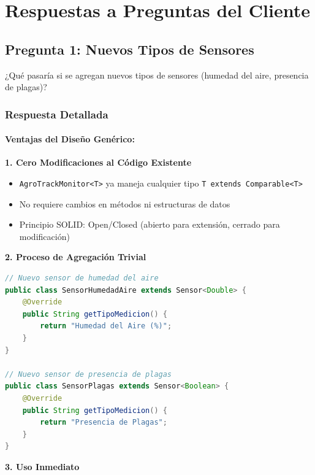 \documentclass[12pt,a4paper]{article}
\begin{document}
\section{Respuestas a Preguntas del Cliente}

\subsection{Pregunta 1: Nuevos Tipos de Sensores}

\begin{tcolorbox}[colback=yellow!10,colframe=orange,title=Pregunta]
¿Qué pasaría si se agregan nuevos tipos de sensores (humedad del aire, presencia de plagas)?
\end{tcolorbox}

\subsubsection{Respuesta Detallada}

\paragraph{Ventajas del Diseño Genérico:}

\textbf{1. Cero Modificaciones al Código Existente}

\begin{itemize}
    \item \texttt{AgroTrackMonitor<T>} ya maneja cualquier tipo \texttt{T extends Comparable<T>}
    \item No requiere cambios en métodos ni estructuras de datos
    \item Principio SOLID: Open/Closed (abierto para extensión, cerrado para modificación)
\end{itemize}

\textbf{2. Proceso de Agregación Trivial}

\begin{lstlisting}[language=Java]
// Nuevo sensor de humedad del aire
public class SensorHumedadAire extends Sensor<Double> {
    @Override
    public String getTipoMedicion() {
        return "Humedad del Aire (%)";
    }
}

// Nuevo sensor de presencia de plagas
public class SensorPlagas extends Sensor<Boolean> {
    @Override
    public String getTipoMedicion() {
        return "Presencia de Plagas";
    }
}
\end{lstlisting}

\textbf{3. Uso Inmediato}
\end{document}
